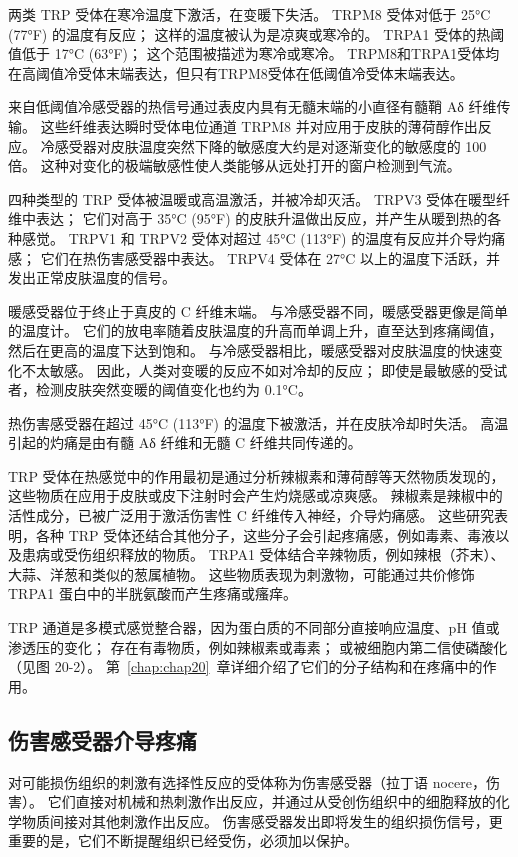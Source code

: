 两类 TRP 受体在寒冷温度下激活，在变暖下失活。
TRPM8 受体对低于 25°C (77°F) 的温度有反应； 这样的温度被认为是凉爽或寒冷的。
TRPA1 受体的热阈值低于 17°C (63°F)；
这个范围被描述为寒冷或寒冷。
TRPM8和TRPA1受体均在高阈值冷受体末端表达，但只有TRPM8受体在低阈值冷受体末端表达。


来自低阈值冷感受器的热信号通过表皮内具有无髓末端的小直径有髓鞘 Aδ 纤维传输。
这些纤维表达瞬时受体电位通道 TRPM8 并对应用于皮肤的薄荷醇作出反应。
冷感受器对皮肤温度突然下降的敏感度大约是对逐渐变化的敏感度的 100 倍。
这种对变化的极端敏感性使人类能够从远处打开的窗户检测到气流。


四种类型的 TRP 受体被温暖或高温激活，并被冷却灭活。
TRPV3 受体在暖型纤维中表达； 它们对高于 35°C (95°F) 的皮肤升温做出反应，并产生从暖到热的各种感觉。
TRPV1 和 TRPV2 受体对超过 45°C (113°F) 的温度有反应并介导灼痛感；
它们在热伤害感受器中表达。 
TRPV4 受体在 27°C 以上的温度下活跃，并发出正常皮肤温度的信号。


暖感受器位于终止于真皮的 C 纤维末端。
与冷感受器不同，暖感受器更像是简单的温度计。
它们的放电率随着皮肤温度的升高而单调上升，直至达到疼痛阈值，然后在更高的温度下达到饱和。
与冷感受器相比，暖感受器对皮肤温度的快速变化不太敏感。
因此，人类对变暖的反应不如对冷却的反应；
即使是最敏感的受试者，检测皮肤突然变暖的阈值变化也约为 0.1°C。


热伤害感受器在超过 45°C (113°F) 的温度下被激活，并在皮肤冷却时失活。
高温引起的灼痛是由有髓 Aδ 纤维和无髓 C 纤维共同传递的。


TRP 受体在热感觉中的作用最初是通过分析辣椒素和薄荷醇等天然物质发现的，这些物质在应用于皮肤或皮下注射时会产生灼烧感或凉爽感。
辣椒素是辣椒中的活性成分，已被广泛用于激活伤害性 C 纤维传入神经，介导灼痛感。
这些研究表明，各种 TRP 受体还结合其他分子，这些分子会引起疼痛感，例如毒素、毒液以及患病或受伤组织释放的物质。
TRPA1 受体结合辛辣物质，例如辣根（芥末）、大蒜、洋葱和类似的葱属植物。
这些物质表现为刺激物，可能通过共价修饰 TRPA1 蛋白中的半胱氨酸而产生疼痛或瘙痒。


TRP 通道是多模式感觉整合器，因为蛋白质的不同部分直接响应温度、pH 值或渗透压的变化；
存在有毒物质，例如辣椒素或毒素；
或被细胞内第二信使磷酸化（见图 20-2）。 
第~\ref{chap:chap20}~章详细介绍了它们的分子结构和在疼痛中的作用。



\subsection{伤害感受器介导疼痛}

对可能损伤组织的刺激有选择性反应的受体称为伤害感受器（拉丁语 nocere，伤害）。
它们直接对机械和热刺激作出反应，并通过从受创伤组织中的细胞释放的化学物质间接对其他刺激作出反应。
伤害感受器发出即将发生的组织损伤信号，更重要的是，它们不断提醒组织已经受伤，必须加以保护。



